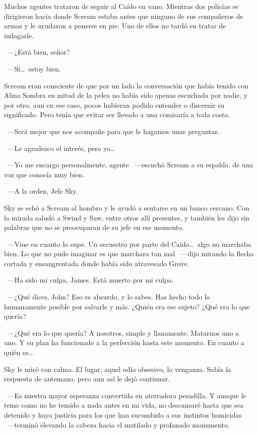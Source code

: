 Muchos agentes trataron de seguir al Caído en vano. Mientras dos policías se dirigieron hacia donde Scream estaba antes que ninguno de sus compañeros de armas y le ayudaron a ponerse en pie. Uno de ellos no tardó en tratar de indagarle.

~---¿Está bien, señor?

~---Sí\dots\ estoy bien.

Scream eran consciente de que por un lado la conversación que había tenido con Alma Sombra en mitad de la pelea no había sido apenas escuchada por nadie, y por otro, aun en ese caso, pocos hubieran podido entender o discernir su significado. Pero tenía que evitar ser llevado a una comisaría a toda costa.

~---Será mejor que nos acompañe para que le hagamos unas preguntas.

~---Le agradezco el interés, pero yo\dots

~---Yo me encargo personalmente, agente ~---escuchó Scream a su espalda, de una voz que conocía muy bien.

~---A la orden, Jefe Sky.

Sky se echó a Scream al hombro y le ayudó a sentarse en un banco cercano. Con la mirada saludó a Swind y Saw, entre otros allí presentes, y también les dijo sin palabras que no se preocuparan de su jefe en ese momento.

~---Vine en cuanto lo supe. Un secuestro por parte del Caído\dots\ algo no marchaba bien. Lo que no pude imaginar es que marchara tan mal ~---dijo mirando la flecha cortada y ensangrentada donde había sido atravesado Grove.

~---Ha sido mi culpa, James. Está muerto por mi culpa.

~---¿Qué dices, John? Eso es absurdo, y lo sabes. Has hecho todo lo humanamente posible por salvarle y más. ¿Quién era ese sujeto? ¿Qué era lo que quería?

~---¿Qué era lo que quería? A nosotros, simple y llanamente. Matarnos uno a uno. Y su plan ha funcionado a la perfección hasta este momento. En cuanto a quién es\dots

Sky le miró con calma. El lugar, aquel odio obsesivo, la venganza. Sabía la respuesta de antemano, pero aun así le dejó continuar.

~---Es nuestra mayor esperanza convertida en aterradora pesadilla. Y aunque le temo como no he temido a nada antes en mi vida, no descansaré hasta que sea detenido y haya justicia para los que han sucumbido a sus instintos homicidas ~---terminó elevando la cabeza hacia el mutilado y profanado monumento.

\endinput
